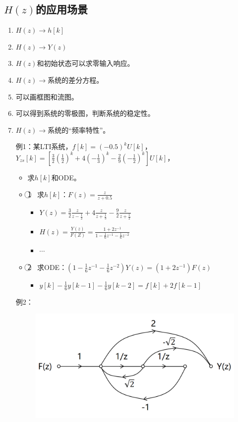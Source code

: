 \documentclass[UTF8]{ctexart}
\begin{document}
\subsection{$H(z)$的应用场景}
\begin{enumerate}[label=(\arabic*),itemindent=0pt,labelindent=\parindent,labelwidth=2em,labelsep=5pt,leftmargin=*]
  \item $H(z)\rightarrow h[k]$
  \item $H(z)\rightarrow Y(z)$
  \item $H(z)$和初始状态可以求零输入响应。
  \item $H(z)\rightarrow$系统的差分方程。
  \item 可以画框图和流图。
  \item 可以得到系统的零极图，判断系统的稳定性。
  \item $H(z)\rightarrow$系统的“频率特性”。\par
        例1：某LTI系统，$f[k]=(-0.5)^kU[k]$，$Y_{zs}[k]=[\frac{3}{2}(\frac{1}{2})^k+4(-\frac{1}{3})^k-\frac{2}{9}(-\frac{1}{2})^k]U[k]$，\par
        \begin{itemize}[label=,left=2.25em]
          \item 求$h[k]$和ODE。
          \item \textcircled{1} \ 求$h[k]$：$F(z)=\frac{z}{z+0.5}$
                \begin{itemize}[label=,left=5.2em]
                  \item $Y(z)=\frac{3}{2}\frac{z}{z-\frac{1}{2}}+4\frac{z}{z+\frac{1}{3}}-\frac{9}{2}\frac{z}{z+\frac{1}{2}}$
                  \item $H(z)=\frac{Y(z)}{F(Z)}=\frac{1+2z^{-1}}{1-\frac{1}{6}z^{-1}-\frac{1}{6}z^{-2}}$
                  \item $\cdots$
                \end{itemize}
          \item \textcircled{2} \ 求ODE：$(1-\frac{1}{6}z^{-1}-\frac{1}{6}z^{-2})Y(z)=(1+2z^{-1})F(z)$
                \begin{itemize}[label=,left=5.7em]
                  \item $y[k]-\frac{1}{6}y[k-1]-\frac{1}{6}y[k-2]=f[k]+2f[k-1]$
                \end{itemize}
        \end{itemize}
        例2：\par
        \begin{figure}[h]
          \centering
          \includegraphics[scale=0.3]{例题2.png}

\end{figure}
\end{enumerate}
\end{document}
